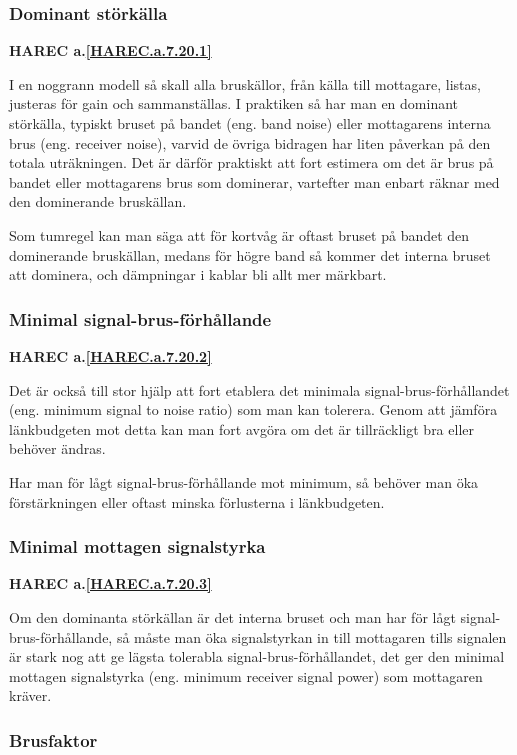 \subsubsection{Dominant störkälla}
\textbf{HAREC a.\ref{HAREC.a.7.20.1}\label{myHAREC.a.7.20.1}}

I en noggrann modell så skall alla bruskällor, från källa till mottagare,
listas, justeras för gain och sammanställas.
I praktiken så har man en dominant störkälla, typiskt bruset på bandet
(eng. band noise) eller mottagarens interna brus (eng. receiver noise),
varvid de övriga bidragen har liten påverkan på den totala uträkningen.
Det är därför praktiskt att fort estimera om det är brus på bandet eller
mottagarens brus som dominerar, vartefter man enbart räknar med den
dominerande bruskällan.

Som tumregel kan man säga att för kortvåg är oftast bruset på bandet
den dominerande bruskällan, medans för högre band så kommer det interna
bruset att dominera, och dämpningar i kablar bli allt mer märkbart.

\subsubsection{Minimal signal-brus-förhållande}
\textbf{HAREC a.\ref{HAREC.a.7.20.2}\label{myHAREC.a.7.20.2}}

Det är också till stor hjälp att fort etablera det minimala
signal-brus-förhållandet (eng. minimum signal to noise ratio)
som man kan tolerera.
Genom att jämföra länkbudgeten mot detta kan man fort avgöra om det är
tillräckligt bra eller behöver ändras.

Har man för lågt signal-brus-förhållande mot minimum, så behöver man öka
förstärkningen eller oftast minska förlusterna i länkbudgeten.

\subsubsection{Minimal mottagen signalstyrka}
\textbf{HAREC a.\ref{HAREC.a.7.20.3}\label{myHAREC.a.7.20.3}}

Om den dominanta störkällan är det interna bruset och man har för lågt
signal-brus-förhållande, så måste man öka signalstyrkan in till mottagaren
tills signalen är stark nog att ge lägsta tolerabla signal-brus-förhållandet,
det ger den minimal mottagen signalstyrka (eng. minimum receiver signal power)
som mottagaren kräver.

\subsubsection{Brusfaktor}

